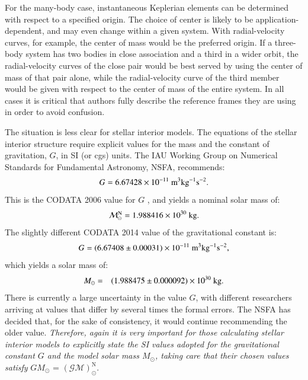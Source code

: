 \documentclass[preprint]{aastex}
\newcommand{\Mnom}{\hbox{$\mathcal{M}^{\mathrm N}_\odot$}}
\newcommand{\GMnom}{\hbox{$\mathcal{(GM)}^{\mathrm N}_\odot$}}
\begin{document}
For the many-body case, instantaneous Keplerian elements can be determined with respect to a specified origin. The choice of center is likely to be application-dependent, and may even change within a given system. With radial-velocity curves, for example, the center of mass would be the preferred origin. If a three-body system has two bodies in close association and a third in a wider orbit, the radial-velocity curves of the close pair would be best served by using the center of mass of that pair alone, while the radial-velocity curve of the third member would be given with respect to the center of mass of the entire system. In all cases it is critical that authors fully describe the
reference frames they are using in order to avoid confusion.

The situation is less clear for stellar interior models. The equations of the stellar interior structure require explicit values for the mass and the constant of gravitation, $G$, in SI (or cgs) units. The IAU Working Group on Numerical Standards for Fundamental Astronomy, NSFA, \citep{luzum2011} recommends:
%
\begin{eqnarray}
G = 6.67428 \times 10^{-11}\ {\rm m}^3{\rm kg}^{-1}{\rm s}^{-2}.\nonumber
\end{eqnarray}
%
This is the CODATA 2006 value for $G$ \citep{mohr2008}, and yields a nominal solar mass of:
%
\begin{eqnarray}
\Mnom = 1.988416 \times 10^{30}\ {\rm kg}. \nonumber
\end{eqnarray}
%
The slightly different CODATA 2014 value of the gravitational constant \citep{mohr2015} is:
%
\begin{eqnarray}
G = (6.67408 \pm 0.00031) \times 10^{-11}\ {\rm m}^3{\rm kg}^{-1}{\rm s}^{-2},\nonumber
\end{eqnarray}
%
which yields a solar mass of:
%
\begin{eqnarray}
M_\odot & = & (1.988475 \pm 0.000092) \times 10^{30}\ {\rm kg}.\nonumber
\end{eqnarray}
%
There is currently a large uncertainty in the value $G$, with different researchers arriving at values that differ by several times the formal errors. The NSFA has decided that, for the sake of consistency, it would continue recommending the older value. {\sl Therefore, again it is very important for those calculating stellar interior models to explicitly state the SI values adopted for the gravitational constant $G$ and the model solar mass $M_\odot$, taking care that their chosen values satisfy} $GM_\odot$ = \GMnom.
\end{document}
